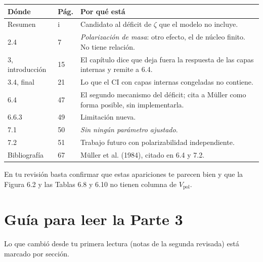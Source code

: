 \documentclass[11pt,a4paper]{article}
\begin{document}
\begin{longtable}{L{2.6cm}L{1.2cm}L{11.0cm}}
\toprule
\textbf{Dónde} & \textbf{Pág.} & \textbf{Por qué está}\\
\midrule
\endhead
Resumen & i & Candidato al déficit de $\zeta$ que el modelo no incluye.\\
2.4 & 7 & \emph{Polarización de masa}: otro efecto, el de núcleo finito. No tiene relación.\\
3, introducción & 15 & El capítulo dice que deja fuera la respuesta de las capas internas y remite a 6.4.\\
3.4, final & 21 & Lo que el CI con capas internas congeladas no contiene.\\
6.4 & 47 & El segundo mecanismo del déficit; cita a Müller como forma posible, sin implementarla.\\
6.6.3 & 49 & Limitación nueva.\\
7.1 & 50 & \emph{Sin ningún parámetro ajustado}.\\
7.2 & 51 & Trabajo futuro con polarizabilidad independiente.\\
Bibliografía & 67 & Müller et al. (1984), citado en 6.4 y 7.2.\\
\end{longtable}

En tu revisión basta confirmar que estas apariciones te parecen bien y que la Figura 6.2 y las Tablas
6.8 y 6.10 no tienen columna de $V_{\text{pol}}$.

\section{Guía para leer la Parte 3}
\label{sec:parte3}

Lo que cambió desde tu primera lectura (notas de la segunda revisada) está marcado por sección.
\end{document}

